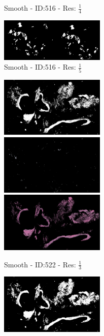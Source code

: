 \documentclass[letterpaper,10pt,oneside]{article}
\begin{document}
\begin{figure}[hbtp]
\begin{subfigure}[b]{5cm}
    \caption{Smooth - ID:516 - Res: $\frac{1}{4}$}
  \end{subfigure}
  \begin{subfigure}[b]{5cm}
    \includegraphics[width=5cm]{visualization/results/smoothhistogram/res_reduce_5/Region_0_PO13-00516A1_1_7_201305171148.png}
    \caption{Smooth - ID:516 - Res: $\frac{1}{5}$}
  \end{subfigure}
  \begin{subfigure}[b]{5cm}
    \includegraphics[width=5cm]{visualization/results/smoothhistogram/res_reduce_3/Region_0_PO13-00522A1_1_2_201305171639.png}
    \includegraphics[width=5cm]{visualization/results/smoothhistogram/res_reduce_3/Region_1_PO13-00522A1_1_2_201305171639.png}
    \includegraphics[width=5cm]{visualization/results/smoothhistogram/res_reduce_3/Region_2_PO13-00522A1_1_2_201305171639.png}
    \caption{Smooth - ID:522 - Res: $\frac{1}{3}$}
  \end{subfigure}
  \begin{subfigure}[b]{5cm}
    \includegraphics[width=5cm]{visualization/results/smoothhistogram/res_reduce_4/Region_0_PO13-00522A1_1_2_201305171639.png}

\end{subfigure}
\end{figure}
\end{document}

